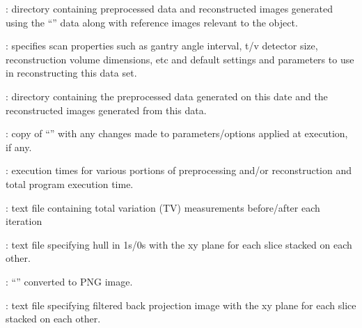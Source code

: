 \begin{tcbfunctionenv}
\begin{tcbparagraph}
\begin{deepList}[labelindent=1pt, leftmargin=*]
\begin{deepList}[labelindent=1pt, leftmargin=*]
\begin{deepList}[labelindent=1pt, leftmargin=*]
\begin{deepList}[labelindent=1pt, leftmargin=*]
\begin{deepList}[labelindent=1pt, leftmargin=*]
\begin{deepList}[labelindent=1pt, leftmargin=*]
\begin{deepList}[labelindent=1pt, leftmargin=*]
                                \item {} : directory containing preprocessed data and reconstructed images generated using the ``'' data along with reference images relevant to the object.
                                	\begin{deepList}[labelindent=1pt, leftmargin=*]
                                    	\item {} : specifies scan properties such as gantry angle interval, t/v detector size, reconstruction volume dimensions, etc and default settings and parameters to use in reconstructing this data set.
                    				\item {} : directory containing the preprocessed data generated on this date and the reconstructed images generated from this data.
                                    \begin{deepList}[labelindent=1pt, leftmargin=*]
                                        \item {} : copy of ``'' with any changes made to parameters/options applied at execution, if any.
                                        \item {} : execution times for various portions of preprocessing and/or reconstruction and total program execution time.
                                        \item {} : text file containing total variation (TV) measurements before/after each iteration
                                        \item {} : text file specifying hull in 1s/0s with the xy plane for each slice stacked on each other.
                                        \item {} : ``'' converted to PNG image.
                                        \item {} : text file specifying filtered back projection image with the xy plane for each slice stacked on each other.

\end{deepList}
\end{deepList}
\end{deepList}
\end{deepList}
\end{deepList}
\end{deepList}
\end{deepList}
\end{deepList}
\end{deepList}
\end{tcbparagraph}
\end{tcbfunctionenv}
